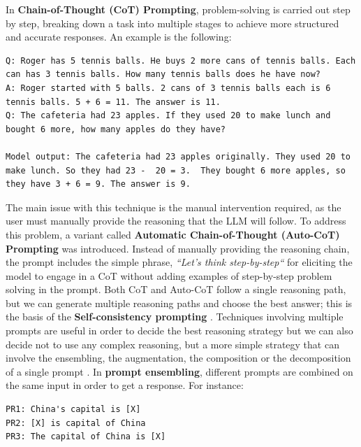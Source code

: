 In \textbf{Chain-of-Thought (CoT) Prompting}, problem-solving is carried out step by step, breaking down a task into multiple stages to achieve more structured and accurate responses.
An example is the following:
\begin{lstlisting}
Q: Roger has 5 tennis balls. He buys 2 more cans of tennis balls. Each can has 3 tennis balls. How many tennis balls does he have now? 
A: Roger started with 5 balls. 2 cans of 3 tennis balls each is 6 tennis balls. 5 + 6 = 11. The answer is 11.  
Q: The cafeteria had 23 apples. If they used 20 to make lunch and bought 6 more, how many apples do they have?

Model output: The cafeteria had 23 apples originally. They used 20 to make lunch. So they had 23 -  20 = 3.  They bought 6 more apples, so they have 3 + 6 = 9. The answer is 9.   
\end{lstlisting}
The main issue with this technique is the manual intervention required, as the user must manually provide the reasoning that the LLM will follow.
To address this problem, a variant called \textbf{Automatic Chain-of-Thought (Auto-CoT) Prompting} was introduced.
Instead of manually providing the reasoning chain, the prompt includes the simple phrase, \textit{``Let's think step-by-step``} 
for eliciting the model to engage in a CoT without adding examples of step-by-step problem solving in the prompt.
Both CoT and Auto-CoT follow a single reasoning path, but we can generate multiple reasoning paths and choose the best answer; this is the basis of the \textbf{Self-consistency prompting} \cite{wang2022self}.
Techniques involving multiple prompts are useful in order to decide the best reasoning strategy but we can also decide not to use any complex reasoning, but a more simple strategy that can involve the ensembling, the augmentation, the composition or the decomposition of a single prompt \cite{liu2023pre}.
In \textbf{prompt ensembling}, different prompts are combined on the same input in order to get a response. For instance:
\begin{lstlisting}
PR1: China's capital is [X]
PR2: [X] is capital of China
PR3: The capital of China is [X]
\end{lstlisting}

